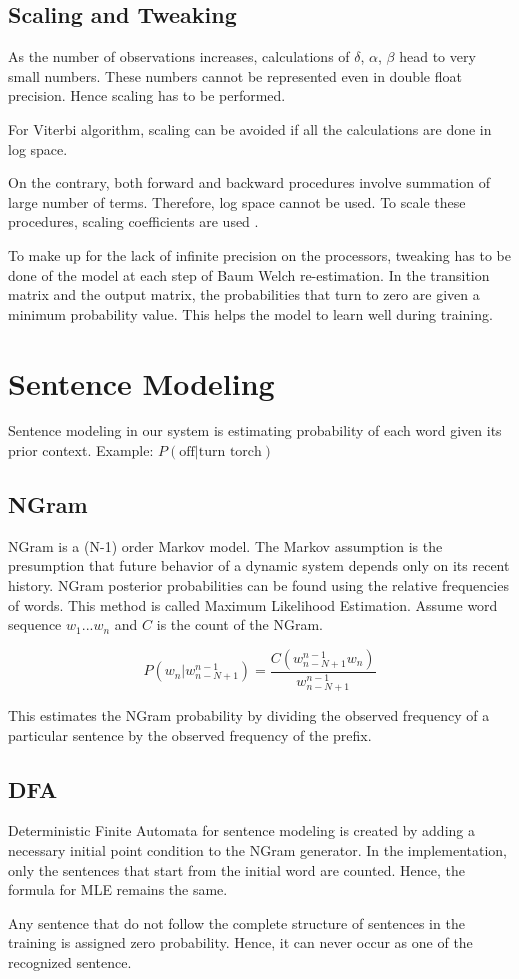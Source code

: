 \section{Scaling and Tweaking}

As the number of observations increases, calculations of $\delta$, $\alpha$, $\beta$ head to very small numbers. These numbers cannot be represented even in double float precision. Hence scaling has to be performed.

For Viterbi algorithm, scaling can be avoided if all the calculations are done in log space. 

On the contrary, both forward and backward procedures involve summation of large number of terms. Therefore, log space cannot be used. To scale these procedures, scaling coefficients are used \cite{18626}.

To make up for the lack of infinite precision on the processors, tweaking has to be done of the model at each step of Baum Welch re-estimation. In the transition matrix and the output matrix, the probabilities that turn to zero are given a minimum probability value. This helps the model to learn well during training.

\chapter{Sentence Modeling}

Sentence modeling in our system is estimating probability of each word given its prior context. Example: $P(\text{off} | \text{turn torch})$

\section{NGram}

NGram is a (N-1) order Markov model. The Markov assumption is the presumption that future behavior of a dynamic system depends only on its recent history. 
NGram posterior probabilities can be found using the relative frequencies of words. This method is called Maximum Likelihood Estimation. Assume word sequence $w_1...w_n$ and $C$ is the count of the NGram.

\begin{equation*}
P(w_n|w_{n-N+1}^{n-1}) = \frac{C(w_{n-N+1}^{n-1} w_n)}{w_{n-N+1}^{n-1}}
\end{equation*}

This estimates the NGram probability by dividing the observed frequency of a particular sentence by the observed frequency of the prefix.

\section{DFA}

Deterministic Finite Automata for sentence modeling is created by adding a necessary initial point condition to the NGram generator. In the implementation, only the sentences that start from the initial word are counted. Hence, the formula for MLE remains the same.

Any sentence that do not follow the complete structure of sentences in the training is assigned zero probability. Hence, it can never occur as one of the recognized sentence.